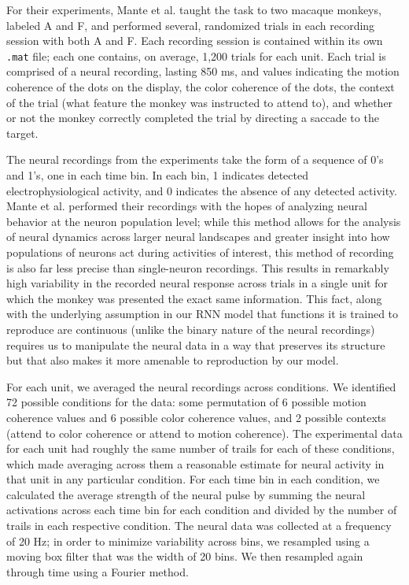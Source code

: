 \documentclass[12pt,a4paper,final]{iopart}
\begin{document}
For their experiments, Mante et al. taught the task to two macaque monkeys, labeled A and F, and performed several, randomized trials in each recording session with both A and F. Each recording session is contained within its own \texttt{.mat} file; each one contains, on average, 1,200 trials for each unit. Each trial is comprised of a neural recording, lasting 850 ms, and values indicating the motion coherence of the dots on the display, the color coherence of the dots, the context of the trial (what feature the monkey was instructed to attend to), and whether or not the monkey correctly completed the trial by directing a saccade to the target.

The neural recordings from the experiments take the form of a sequence of 0's and 1's, one in each time bin. In each bin, 1 indicates detected electrophysiological activity, and 0 indicates the absence of any detected activity. Mante et al. performed their recordings with the hopes of analyzing neural behavior at the neuron population level; while this method allows for the analysis of neural dynamics across larger neural landscapes and greater insight into how populations of neurons act during activities of interest, this method of recording is also far less precise than single-neuron recordings. This results in remarkably high variability in the recorded neural response across trials in a single unit for which the monkey was presented the exact same information. This fact, along with the underlying assumption in our RNN model that functions it is trained to reproduce are continuous (unlike the binary nature of the neural recordings) requires us to manipulate the neural data in a way that preserves its structure but that also makes it more amenable to reproduction by our model. 

For each unit, we averaged the neural recordings across conditions. We identified 72 possible conditions for the data: some permutation of 6 possible motion coherence values and 6 possible color coherence values, and 2 possible contexts (attend to color coherence or attend to motion coherence). The experimental data for each unit had roughly the same number of trails for each of these conditions, which made averaging across them a reasonable estimate for neural activity in that unit in any particular condition. For each time bin in each condition, we calculated the average strength of the neural pulse by summing the neural activations across each time bin for each condition and divided by the number of trails in each respective condition. The neural data was collected at a frequency of 20 Hz; in order to minimize variability across bins, we resampled using a moving box filter that was the width of 20 bins. We then resampled again through time using a Fourier method.
\end{document}
